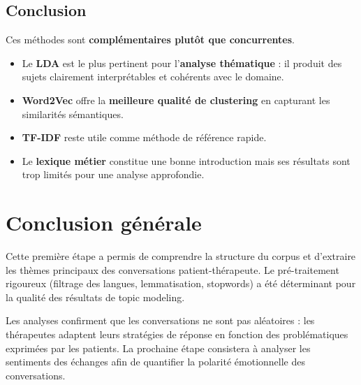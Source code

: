 \documentclass[12pt,a4paper]{article}
\begin{document}
\subsection{Conclusion}

Ces méthodes sont \textbf{complémentaires plutôt que concurrentes}.

\begin{itemize}
  \item Le \textbf{LDA} est le plus pertinent pour l'\textbf{analyse thématique} : il produit
        des sujets clairement interprétables et cohérents avec le domaine.
  \item \textbf{Word2Vec} offre la \textbf{meilleure qualité de clustering} en capturant les
        similarités sémantiques.
  \item \textbf{TF-IDF} reste utile comme méthode de référence rapide.
  \item Le \textbf{lexique métier} constitue une bonne introduction mais ses résultats sont
        trop limités pour une analyse approfondie.
\end{itemize}

\clearpage
\section{Conclusion générale}

Cette première étape a permis de comprendre la structure du corpus et d'extraire les thèmes
principaux des conversations patient-thérapeute. Le pré-traitement rigoureux (filtrage des
langues, lemmatisation, stopwords) a été déterminant pour la qualité des résultats de topic
modeling.

Les analyses confirment que les conversations ne sont pas aléatoires : les thérapeutes adaptent
leurs stratégies de réponse en fonction des problématiques exprimées par les patients. La
prochaine étape consistera à analyser les sentiments des échanges afin de quantifier la
polarité émotionnelle des conversations.

\pagebreak
\end{document}
